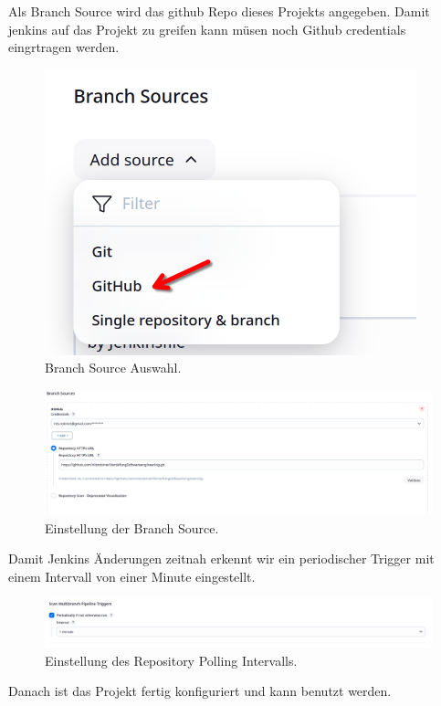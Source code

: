 Als Branch Source wird das github Repo dieses Projekts angegeben. Damit jenkins auf das Projekt zu greifen kann müsen noch Github credentials eingrtragen werden.

\begin{figure}[H]
    \centering
    \includegraphics[scale=0.4]{res/Jenkins_03.png}
    \caption{Branch Source Auswahl.}
\end{figure}
\begin{figure}[H]
    \centering
    \includegraphics[scale=0.4]{res/Jenkins_05.png}
    \caption{Einstellung der Branch Source.}
\end{figure}

Damit Jenkins Änderungen zeitnah erkennt wir ein periodischer Trigger mit einem Intervall von einer Minute eingestellt.

\begin{figure}[H]
    \centering
    \includegraphics[scale=0.4]{res/Jenkins_06.png}
    \caption{Einstellung des Repository Polling Intervalls.}
\end{figure}

Danach ist das Projekt fertig konfiguriert und kann benutzt werden.

